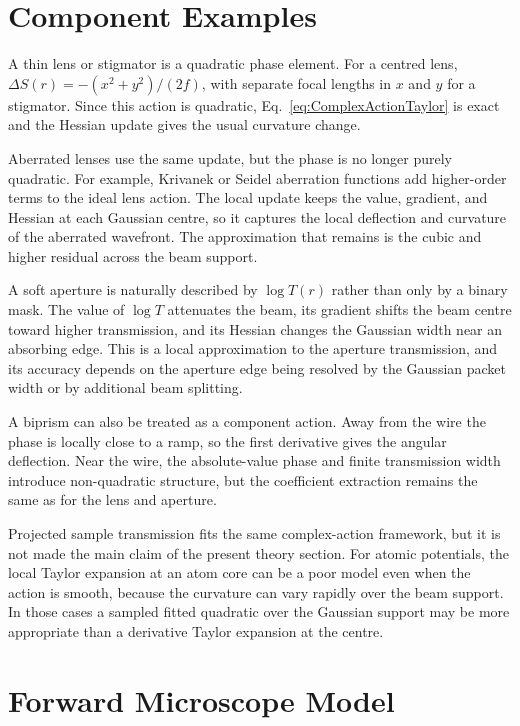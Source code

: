 \documentclass{article}
\begin{document}
\section{Component Examples}

A thin lens or stigmator is a quadratic phase element. 
For a centred lens, $\Delta S(r)=-(x^2+y^2)/(2f)$, with separate focal lengths in $x$ and $y$ for a stigmator. 
Since this action is quadratic, Eq.~\eqref{eq:ComplexActionTaylor} is exact and the Hessian update gives the usual curvature change.

Aberrated lenses use the same update, but the phase is no longer purely quadratic. 
For example, Krivanek or Seidel aberration functions add higher-order terms to the ideal lens action. 
The local update keeps the value, gradient, and Hessian at each Gaussian centre, so it captures the local deflection and curvature of the aberrated wavefront. 
The approximation that remains is the cubic and higher residual across the beam support.

A soft aperture is naturally described by $\log T(r)$ rather than only by a binary mask. 
The value of $\log T$ attenuates the beam, its gradient shifts the beam centre toward higher transmission, and its Hessian changes the Gaussian width near an absorbing edge. 
This is a local approximation to the aperture transmission, and its accuracy depends on the aperture edge being resolved by the Gaussian packet width or by additional beam splitting.

A biprism can also be treated as a component action. 
Away from the wire the phase is locally close to a ramp, so the first derivative gives the angular deflection. 
Near the wire, the absolute-value phase and finite transmission width introduce non-quadratic structure, but the coefficient extraction remains the same as for the lens and aperture.

Projected sample transmission fits the same complex-action framework, but it is not made the main claim of the present theory section. 
For atomic potentials, the local Taylor expansion at an atom core can be a poor model even when the action is smooth, because the curvature can vary rapidly over the beam support. 
In those cases a sampled fitted quadratic over the Gaussian support may be more appropriate than a derivative Taylor expansion at the centre.

\section{Forward Microscope Model}
\end{document}

